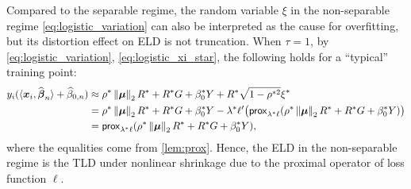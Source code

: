 \begin{rem}
    Compared to the separable regime, the random variable $\xi$ in the non-separable regime \cref{eq:logistic_variation} can also be interpreted as the cause for overfitting, but its distortion effect on ELD is not truncation. When $\tau = 1$, by \cref{eq:logistic_variation}, \eqref{eq:logistic_xi_star}, the following holds for a ``typical'' training point:
\begin{equation*}
\begin{aligned}
    y_i (\langle {\boldsymbol{x}}_i, \widehat {{\boldsymbol{\beta}}}_n \rangle + \widehat \beta_{0,n}) 
    & \approx 
    \rho^*\left\|{{\boldsymbol{\mu}}}\right\|_2 R^* + R^*G + \beta_0^* Y + R^*\sqrt{1 - \rho^{*2}} \xi^* \\
    & = \rho^*\left\|{{\boldsymbol{\mu}}}\right\|_2 R^* + R^*G + \beta_0^* Y 
    - \lambda^* 
            \ell' \bigl( \mathsf{prox}_{ \lambda^* \ell}( \rho^*\left\|{{\boldsymbol{\mu}}}\right\|_2 R^* + R^*G + \beta_0^* Y ) \bigr) \\
    & = \mathsf{prox}_{ \lambda^* \ell}( \rho^*\left\|{{\boldsymbol{\mu}}}\right\|_2 R^* + R^*G + \beta_0^* Y ),
\end{aligned}
\end{equation*}
where the equalities come from \cref{lem:prox}. Hence, the ELD in the non-separable regime is the TLD under nonlinear shrinkage due to the proximal operator of loss function $\ell$.
\end{rem}
